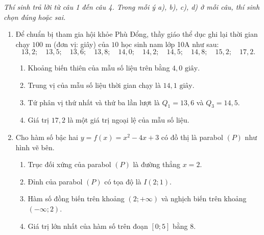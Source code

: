 \documentclass[12pt,a4paper]{article}
\newcommand{\parttitle}[1]{\par\vspace{3.5pt}\needspace{3\baselineskip}{\large\bfseries\color{ink}#1}\par\nopagebreak\vspace{2pt}}
\begin{document}
\vspace{3pt}
\parttitle{PHẦN II. Câu trắc nghiệm đúng sai}
\textit{Thí sinh trả lời từ câu 1 đến câu 4. Trong mỗi ý a), b), c), d) ở mỗi câu, thí sinh chọn đúng hoặc sai.}
\begin{enumerate}
\item Để chuẩn bị tham gia hội khỏe Phù Đổng, thầy giáo thể dục ghi lại thời gian chạy $100\text{ m}$ (đơn vị: giây) của $10$ học sinh nam lớp 10A như sau:
$$13{,}2;\quad 13{,}5;\quad 13{,}6;\quad 13{,}8;\quad 14{,}0;\quad 14{,}2;\quad 14{,}5;\quad 14{,}8;\quad 15{,}2;\quad 17{,}2.$$
\begin{enumerate}
    \item Khoảng biến thiên của mẫu số liệu trên bằng $4{,}0\text{ giây}$.
    \item Trung vị của mẫu số liệu thời gian chạy là $14{,}1\text{ giây}$.
    \item Tứ phân vị thứ nhất và thứ ba lần lượt là $Q_1 = 13{,}6$ và $Q_3 = 14{,}5$.
    \item Giá trị $17{,}2$ là một giá trị ngoại lệ của mẫu số liệu.
\end{enumerate}

\item Cho hàm số bậc hai $y = f(x) = x^2 - 4x + 3$ có đồ thị là parabol $(P)$ như hình vẽ bên.
\par\noindent\begin{minipage}[t]{0.70\linewidth}
\begin{enumerate}
    \item Trục đối xứng của parabol $(P)$ là đường thẳng $x = 2$.
    \item Đỉnh của parabol $(P)$ có tọa độ là $I(2; 1)$.
    \item Hàm số đồng biến trên khoảng $(2; +\infty)$ và nghịch biến trên khoảng $(-\infty; 2)$.
    \item Giá trị lớn nhất của hàm số trên đoạn $[0; 5]$ bằng $8$.
\end{enumerate}
\end{minipage}\hfill
\begin{minipage}[t]{0.28\linewidth}\raggedleft\vspace{-4pt}
\end{minipage}


\end{enumerate}
\end{document}
